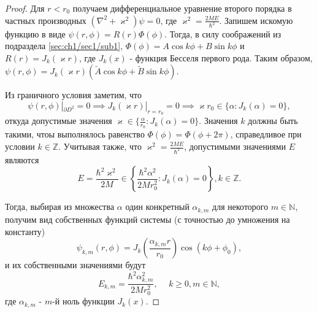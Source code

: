 \begin{proof}
Для $r < r_0$ получаем дифференциальное уравнение второго порядка в частных производных $(\nabla^2 + \varkappa^2)\psi = 0$, где $\varkappa^2 = \frac{2M E}{\hbar^2}$. Запишем искомую функцию в виде $\psi(r, \phi) = R(r)\Phi(\phi)$. Тогда, в силу соображений из подраздела \ref{sec:ch1/sec1/sub1}, $\Phi(\phi) = A\cos{k\phi} + B\sin{k\phi}$ и $R(r) = J_k(\varkappa r)$, где $J_k(x)$ - функция Бесселя первого рода. Таким образом, $\psi(r, \phi) = J_k(\varkappa r) (\widetilde{A}\cos{k\phi} + \widetilde{B}\sin{k\phi} )$.

Из граничного условия заметим, что $$\psi(r, \phi) |_{\partial D^2} = 0 \implies J_k(\varkappa r)|_{r=r_0} = 0 \implies \varkappa r_0 \in \{\alpha: J_k(\alpha) = 0\},$$
откуда допустимые значения $\varkappa \in \{ \frac{\alpha}{r_0} : J_k(\alpha)=0 \}$. Значения $k$ должны быть такими, чтоы выполнялось равенство $\Phi(\phi) = \Phi(\phi+2\pi)$, справедливое при условии $k \in \mathbb{Z}$. Учитывая также, что $\varkappa^2 = \frac{2M E}{\hbar^2}$, допустимыми значениями $E$ являются
$$E = \frac{\hbar^2\varkappa^2}{2M} \in \left\{ \frac{\hbar^2\alpha^2}{2Mr_0^2}: J_k(\alpha)=0 \right\}, k \in \mathbb{Z}.$$

Тогда, выбирая из множества $\alpha$ один конкретный $\alpha_{k, m}$ для некоторого $m \in \mathbb{N}$, получим вид собственных функций системы (с точностью до умножения на константу) 
$$\psi_{k, m}(r, \phi) = J_k\left(\frac{\alpha_{k, m}r}{r_0}\right) \cos{(k \phi + \phi_0)},$$
и их собственными значениями будут
$$E_{k, m} = \frac{\hbar^2\alpha_{k, m}^2}{2Mr_0^2}, \hspace{15pt} k \geq 0, m \in \mathbb{N},$$
где $\alpha_{k, m}$ - $m$-й ноль функции $J_k(x)$.
\end{proof}

